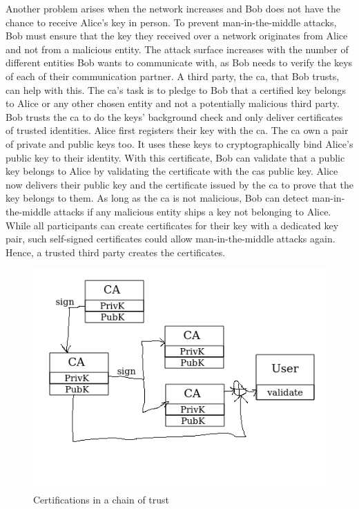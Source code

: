 Another problem arises when the network increases and Bob does not have the
chance to receive Alice's key in person. To prevent man-in-the-middle attacks,
Bob must ensure that the key they received over a network originates from Alice
and not from a malicious entity. The attack surface increases with the number of
different entities Bob wants to communicate with, as Bob needs to verify the
keys of each of their communication partner. A third party, the \gls{ca}, that
Bob trusts, can help with this. The \gls{ca}'s task is to pledge to Bob that a
certified key belongs to Alice or any other chosen entity and not a potentially
malicious third party. Bob trusts the \gls{ca} to do the keys' background check
and only deliver certificates of trusted identities. Alice first registers their
key with the \gls{ca}. The \gls{ca} own a pair of private and public keys too.
It uses these keys to cryptographically bind Alice's public key to their
identity. With this certificate, Bob can validate that a public key belongs to
Alice by validating the certificate with the \gls{ca}s public key. Alice now
delivers their public key and the certificate issued by the \gls{ca} to prove
that the key belongs to them. As long as the \gls{ca} is not malicious, Bob can
detect man-in-the-middle attacks if any malicious entity ships a key not
belonging to Alice. While all participants can create certificates for their key
with a dedicated key pair, such self-signed certificates could allow
man-in-the-middle attacks again. Hence, a trusted third party creates the
certificates.\\

\begin{figure}
    \begin{center}
        \includegraphics[width=.6\textwidth]{images/chain_of_trust_placeholder.png}
        \caption{Certifications in a chain of trust}
        \label{fig:state:technical:chain_of_trust}
    \end{center}
\end{figure}

